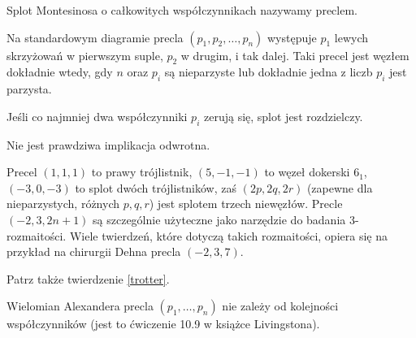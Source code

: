\begin{definition}
	\label{def:pretzel}
	Splot Montesinosa o całkowitych współczynnikach nazywamy preclem.
\end{definition}

Na standardowym diagramie precla $(p_1, p_2, \ldots, p_n)$ występuje $p_1$ lewych skrzyżowań w pierwszym suple, $p_2$ w drugim, i tak dalej.
Taki precel jest węzłem dokładnie wtedy, gdy $n$ oraz $p_i$ są nieparzyste lub dokładnie jedna z liczb $p_i$ jest parzysta.

\begin{proposition}
	Jeśli co najmniej dwa współczynniki $p_i$ zerują się, splot jest rozdzielczy.
\end{proposition}

Nie jest prawdziwa implikacja odwrotna.

Precel $(1,1,1)$ to prawy trójlistnik, $(5, -1, -1)$ to węzeł dokerski $6_1$, $(-3, 0, -3)$ to splot dwóch trójlistników, zaś $(2p, 2q, 2r)$ (zapewne dla nieparzystych, różnych $p, q, r$) jest splotem trzech niewęzłów.
Precle $(-2, 3, 2n+1)$ są szczególnie użyteczne jako narzędzie do badania 3-rozmaitości.
Wiele twierdzeń, które dotyczą takich rozmaitości, opiera się na przykład na chirurgii Dehna precla $(-2, 3, 7)$.

Patrz także twierdzenie \ref{trotter}.

Wielomian Alexandera precla $(p_1, \ldots, p_n)$ nie zależy od kolejności współczynników (jest to ćwiczenie 10.9 w książce Livingstona).